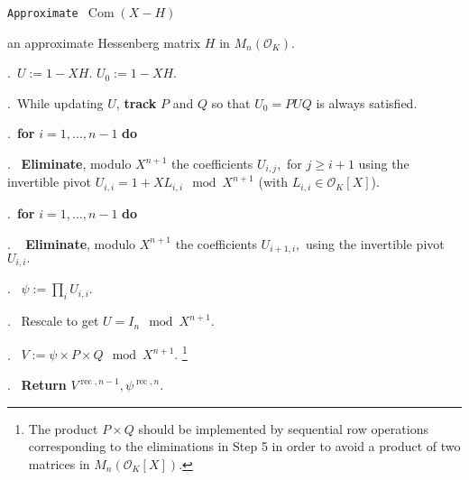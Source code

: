 \documentclass{sig-alternate-05-2015}
\DeclareMathOperator{\com}{Com}
\DeclareMathOperator{\rec}{rec}
\newcommand{\OK}{\mathcal{O}_K}
\begin{document}
\noindent\hrulefill

 {\tt Approximate $\com (X -H)$ }

 an approximate Hessenberg matrix $H$ in $M_n(\OK).$

\smallskip

.\ $U:=1-XH.$ $U_0:=1-XH.$

.\ While updating $U$, \textbf{track} $P$ and $Q$ so that $U_0=PUQ$ is always satisfied.

.\ {\bf for} $i=1,\dots,n-1$ {\bf do} 

.\  \:  \textbf{Eliminate}, modulo $X^{n+1}$ the coefficients $U_{i,j},$ for $j\geq i+1$ 
using the invertible pivot
$U_{i,i}=1+XL_{i,i} \mod X^{n+1}$ (with $L_{i,i} \in \OK[X]$). 

.\    {\bf for} $i=1,\dots,n-1$ {\bf do} 

. \  \:  \textbf{Eliminate}, modulo $X^{n+1}$ the coefficients $U_{i+1,i},$
using the invertible pivot $U_{i,i}.$

. \ $\psi:=\prod_i U_{i,i}.$

. \ Rescale to get $U = I_n \mod X^{n+1}.$

. \ $V:=\psi \times P \times Q   \mod X^{n+1}.$ \footnote{The product $P \times Q$
should be implemented by sequential row operations corresponding to the eliminations in Step 5
in order to avoid a product of two matrices in $M_n(\OK[X])$.}

. \ \textbf{Return} $V^{\rec,n-1}, \psi^{\rec,n}.$

\vspace{-1ex}\noindent\hrulefill

\medskip
\end{document}
